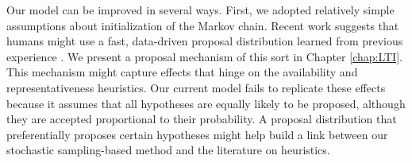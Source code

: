 Our model can be improved in several ways. First, we adopted relatively simple assumptions about initialization of the Markov chain. Recent work suggests that humans might use a fast, data-driven proposal distribution learned from previous experience \citep{Yildirim15,Gershman2014b}. We present a proposal mechanism of this sort in Chapter \ref{chap:LTI}.
This mechanism might capture effects that hinge on the availability and representativeness heuristics. Our current model fails to replicate these effects because it assumes that all hypotheses are equally likely to be proposed, although they are accepted proportional to their probability. A proposal distribution that preferentially proposes certain hypotheses might help build a link between our stochastic sampling-based method and the literature on heuristics.





